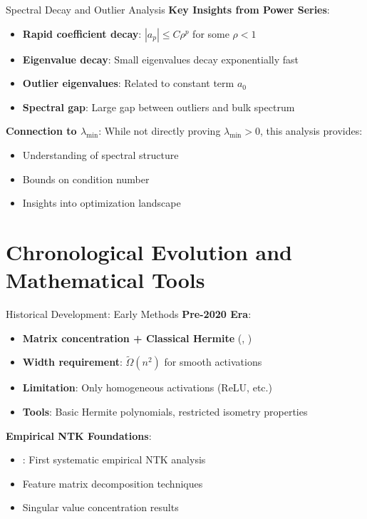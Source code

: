 \begin{frame}{Spectral Decay and Outlier Analysis}
  \textbf{Key Insights from Power Series}:
  \begin{itemize}[<+->]
    \item \textbf{Rapid coefficient decay}: $|a_p| \leq C \rho^p$ for some $\rho < 1$
    \item \textbf{Eigenvalue decay}: Small eigenvalues decay exponentially fast
    \item \textbf{Outlier eigenvalues}: Related to constant term $a_0$
    \item \textbf{Spectral gap}: Large gap between outliers and bulk spectrum
  \end{itemize}
  
  \textbf{Connection to $\lambda_{\min}$}:
  While not directly proving $\lambda_{\min} > 0$, this analysis provides:
  \begin{itemize}
    \item Understanding of spectral structure
    \item Bounds on condition number
    \item Insights into optimization landscape
  \end{itemize}
\end{frame}

\section{Chronological Evolution and Mathematical Tools}

\begin{frame}{Historical Development: Early Methods}
  \textbf{Pre-2020 Era}:
  \begin{itemize}[<+->]
    \item \textbf{Matrix concentration + Classical Hermite} (\cite{SD-JL-HL-LW-XZ:19}, \cite{oymak2020hermite})
    \item \textbf{Width requirement}: $\tilde{\Omega}(n^2)$ for smooth activations
    \item \textbf{Limitation}: Only homogeneous activations (ReLU, etc.)
    \item \textbf{Tools}: Basic Hermite polynomials, restricted isometry properties
  \end{itemize}
  
  \textbf{Empirical NTK Foundations}:
  \begin{itemize}[<+->]
    \item \cite{nguyen2021tight}: First systematic empirical NTK analysis
    \item Feature matrix decomposition techniques
    \item Singular value concentration results
  \end{itemize}
\end{frame}

